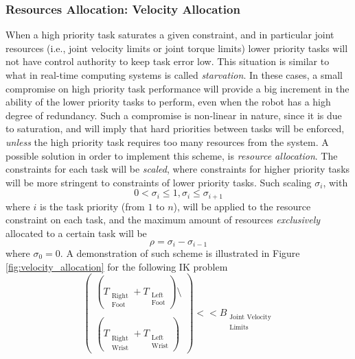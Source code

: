 \subsubsection{Resources Allocation: Velocity Allocation}
\label{velocity_allocation}
When a high priority task saturates a given constraint, and in particular joint resources (i.e., joint velocity limits or joint torque limits) lower priority tasks will not have control authority to keep task error low. This situation is similar to what in real-time computing systems is called \emph{starvation}. In these cases, a small compromise on high priority task performance will provide a big increment in the ability of the lower priority tasks to perform, even when the robot has a high degree of redundancy. Such a compromise is non-linear in nature, since it is due to saturation, and will imply that hard priorities between tasks will be enforced, \emph{unless} the high priority task requires too many resources from the system. A possible solution in order to implement this scheme, is \emph{resource allocation}. The constraints for each task will be \emph{scaled}, where constraints for higher priority tasks will be more stringent to constraints of lower priority tasks. Such scaling $\sigma_i$, with
\begin{equation}
0 < \sigma_i \leq 1, \sigma_i \leq \sigma_{i+1}
\label{eq:scaling_relation}
\end{equation}
where $i$ is the task priority (from $1$ to $n$), will be applied to the resource constraint on each task, and the maximum amount of resources \emph{exclusively} allocated to a certain task will be 
\begin{equation}
\rho = \sigma_i-\sigma_{i-1}
\end{equation}
where $\sigma_0 = 0$. A demonstration of such scheme is illustrated in Figure \ref{fig:velocity_allocation} for the following IK problem 
\begin{equation}
\begin{pmatrix}
\left(T_{\substack{\text{Right}\\\text{Foot}}} + T_{\substack{\text{Left}\\\text{Foot}}}\right)\setminus\\
\\
\left(T_{\substack{\text{Right}\\\text{Wrist}}} + T_{\substack{\text{Left}\\\text{Wrist}}}\right)
\end{pmatrix}
<< B_{\substack{\text{Joint Velocity}\\\text{Limits}}}
\end{equation}
